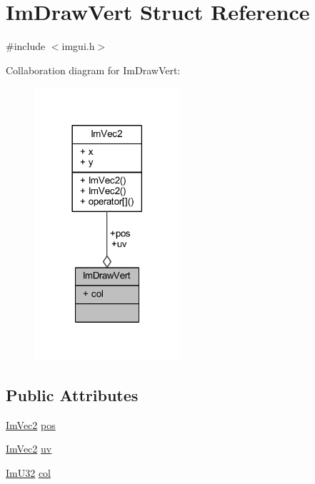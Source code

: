 \hypertarget{struct_im_draw_vert}{}\section{Im\+Draw\+Vert Struct Reference}
\label{struct_im_draw_vert}


{\ttfamily \#include $<$imgui.\+h$>$}



Collaboration diagram for Im\+Draw\+Vert\+:
\nopagebreak
\begin{figure}[H]
\begin{center}
\leavevmode
\includegraphics[width=153pt]{struct_im_draw_vert__coll__graph}
\end{center}
\end{figure}
\subsection*{Public Attributes}
\begin{DoxyCompactItemize}
\item 
\mbox{\hyperlink{struct_im_vec2}{Im\+Vec2}} \mbox{\hyperlink{struct_im_draw_vert_aedc578bbf364ddea71be12b4f177a5b4}{pos}}
\item 
\mbox{\hyperlink{struct_im_vec2}{Im\+Vec2}} \mbox{\hyperlink{struct_im_draw_vert_abdf3183529055a6c3f709b23a4bf06b1}{uv}}
\item 
\mbox{\hyperlink{imgui_8h_a118cff4eeb8d00e7d07ce3d6460eed36}{Im\+U32}} \mbox{\hyperlink{struct_im_draw_vert_ab98ba53ce2690b56f5ba94682ed83940}{col}}
\end{DoxyCompactItemize}


